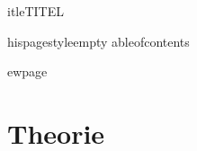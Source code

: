       

\subject{VERSUCH NUMMER}
	itle{TITEL}
\date{%
  Durchführung: DATUM
  \hspace{3em}
  Abgabe: DATUM
}



\maketitle
	hispagestyle{empty}
	ableofcontents

ewpage

\section{Theorie}

\printbibliography{}


